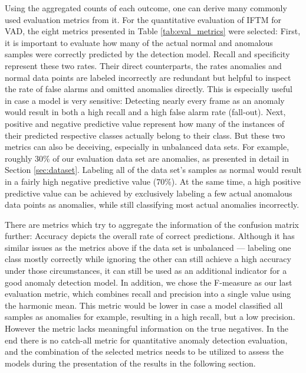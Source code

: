 Using the aggregated counts of each outcome, one can derive many commonly used evaluation metrics from it. For the quantitative evaluation of IFTM for VAD, the eight metrics presented in Table \ref{tab:eval_metrics} were selected: First, it is important to evaluate how many of the actual normal and anomalous samples were correctly predicted by the detection model. Recall and specificity represent these two rates. Their direct counterparts, the rates anomalies and normal data points are labeled incorrectly are redundant but helpful to inspect the rate of false alarms and omitted anomalies directly. This is especially useful in case a model is very sensitive: Detecting nearly every frame as an anomaly would result in both a high recall and a high false alarm rate (fall-out). Next, positive and negative predictive value represent how many of the instances of their predicted respective classes actually belong to their class. But these two metrics can also be deceiving, especially in unbalanced data sets. For example, roughly $30\%$ of our evaluation data set are anomalies, as presented in detail in Section \ref{sec:dataset}. Labeling all of the data set's samples as normal would result in a fairly high negative predictive value ($70\%$). At the same time, a high positive predictive value can be achieved by exclusively labeling a few actual anomalous data points as anomalies, while still classifying most actual anomalies incorrectly. 

There are metrics which try to aggregate the information of the confusion matrix further: Accuracy depicts the overall rate of correct predictions. Although it has similar issues as the metrics above if the data set is unbalanced --- labeling one class mostly correctly while ignoring the other can still achieve a high accuracy under those circumstances, it can still be used as an additional indicator for a good anomaly detection model. In addition, we chose the F-measure as our last evaluation metric, which combines recall and precision into a single value using the harmonic mean. This metric would be lower in case a model classified all samples as anomalies for example, resulting in a high recall, but a low precision. However the metric lacks meaningful information on the true negatives. In the end there is no catch-all metric for quantitative anomaly detection evaluation, and the combination of the selected metrics needs to be utilized to assess the models during the presentation of the results in the following section.


